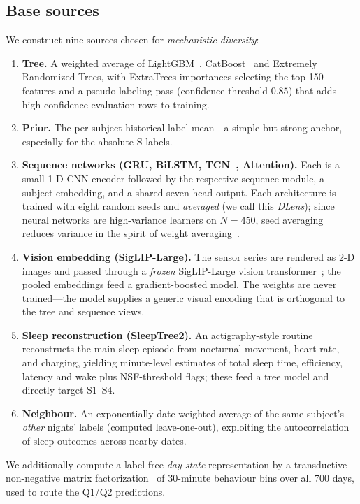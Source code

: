 \documentclass[conference]{IEEEtran}
\begin{document}
\subsection{Base sources}
We construct nine sources chosen for \emph{mechanistic diversity}:
\begin{enumerate}
\item \textbf{Tree.} A weighted average of LightGBM~\cite{lightgbm},
CatBoost~\cite{catboost} and Extremely Randomized Trees, with ExtraTrees importances
selecting the top 150 features and a pseudo-labeling pass (confidence threshold $0.85$)
that adds high-confidence evaluation rows to training.
\item \textbf{Prior.} The per-subject historical label mean---a simple but strong
anchor, especially for the absolute S labels.
\item \textbf{Sequence networks (GRU, BiLSTM, TCN~\cite{tcn}, Attention).} Each is a
small 1-D CNN encoder followed by the respective sequence module, a subject embedding,
and a shared seven-head output. Each architecture is trained with eight random seeds
and \emph{averaged} (we call this \emph{DLens}); since neural networks are
high-variance learners on $N{=}450$, seed averaging reduces variance in the spirit of
weight averaging~\cite{swa}.
\item \textbf{Vision embedding (SigLIP-Large).} The sensor series are rendered as 2-D
images and passed through a \emph{frozen} SigLIP-Large vision
transformer~\cite{siglip}; the pooled embeddings feed a gradient-boosted model. The
weights are never trained---the model supplies a generic visual encoding that is
orthogonal to the tree and sequence views.
\item \textbf{Sleep reconstruction (SleepTree2).} An actigraphy-style routine
reconstructs the main sleep episode from nocturnal movement, heart rate, and charging,
yielding minute-level estimates of total sleep time, efficiency, latency and wake plus
NSF-threshold flags; these feed a tree model and directly target S1--S4.
\item \textbf{Neighbour.} An exponentially date-weighted average of the same subject's
\emph{other} nights' labels (computed leave-one-out), exploiting the autocorrelation
of sleep outcomes across nearby dates.
\end{enumerate}
We additionally compute a label-free \emph{day-state} representation by a transductive
non-negative matrix factorization~\cite{nmf} of 30-minute behaviour bins over all 700
days, used to route the Q1/Q2 predictions.
\end{document}
